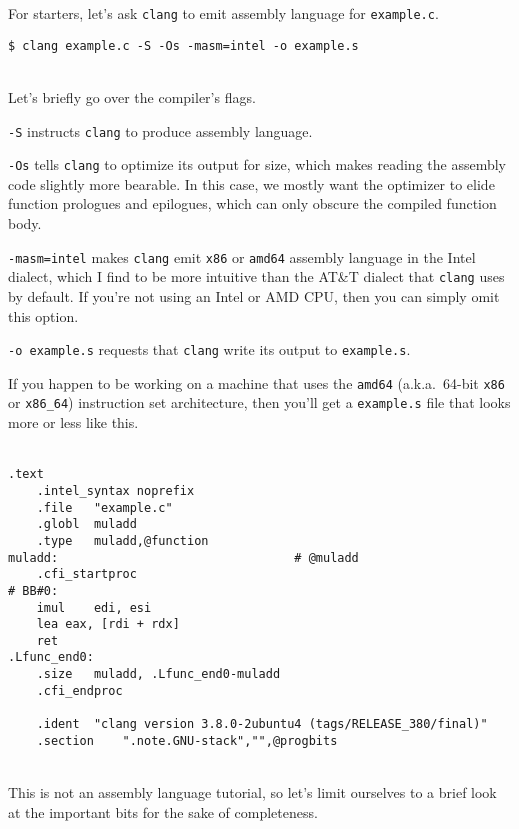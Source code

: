 \documentclass[12pt,a4paper]{article}
\newcommand{\clang}{\texttt{clang}}
\newcommand{\CC}{\clang{}}
\newcommand{\filename}[1]{\texttt{#1}}
\begin{document}
For starters, let's ask \CC{} to emit assembly language for \filename{example.c}. 
\ \\
\begin{lstlisting}[caption=compiling \filename{example.c} to assembly language]
$ clang example.c -S -Os -masm=intel -o example.s
\end{lstlisting}
\ \\
Let's briefly go over the compiler's flags.

\begin{compactitem}
	
	\item \texttt{-S} instructs \CC{} to produce assembly language.
	
	\item \texttt{-Os} tells \CC{} to optimize its output for size, which makes reading the assembly code slightly more bearable. In this case, we mostly want the optimizer to elide function prologues and epilogues, which can only obscure the compiled function body.  
	
	\item \texttt{-masm=intel} makes \CC{} emit \texttt{x86} or \texttt{amd64} assembly language in the Intel dialect, which I find to be more intuitive than the AT\&T dialect that \CC{} uses by default. If you're not using an Intel or AMD CPU, then you can simply omit this option.
	
	\item \texttt{-o example.s} requests that \CC{} write its output to \filename{example.s}.
	
\end{compactitem}

\noindent If you happen to be working on a machine that uses the \texttt{amd64} (a.k.a.\ 64-bit \texttt{x86} or \texttt{x86\_64}) instruction set architecture, then you'll get a \filename{example.s} file that looks more or less like this. \\\
\lstset{language=[x64]Assembler}
\begin{lstlisting}[caption=\texttt{example.s},label=lst:example.s]
	.text
	.intel_syntax noprefix
	.file	"example.c"
	.globl	muladd
	.type	muladd,@function
muladd:                                 # @muladd
	.cfi_startproc
# BB#0:
	imul	edi, esi
	lea	eax, [rdi + rdx]
	ret
.Lfunc_end0:
	.size	muladd, .Lfunc_end0-muladd
	.cfi_endproc
	
	.ident	"clang version 3.8.0-2ubuntu4 (tags/RELEASE_380/final)"
	.section	".note.GNU-stack","",@progbits
\end{lstlisting}
\lstset{language=}
\ \\
This is not an assembly language tutorial, so let's limit ourselves to a brief look at the important bits for the sake of completeness.
\end{document}
